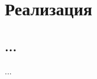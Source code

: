 \documentclass[../document.tex]{subfiles}
\begin{document}
    \section{Реализация}
        \subsection{...}
            \par ...
\end{document}
